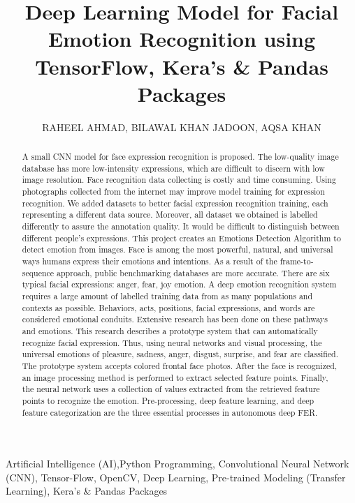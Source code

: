 \documentclass{ieeeaccess}
\begin{document}
\title{Deep Learning Model for Facial Emotion Recognition using TensorFlow, Kera’s & Pandas Packages}
\author
{\uppercase{Raheel Ahmad},\uppercase{ Bilawal Khan Jadoon},\uppercase{ Aqsa Khan}}
\address {MS-AI Students, Sino-Pak Center for Artificial Intelligence (SPCAI), Pak-Austria Fachhochschule: Institute of Applied Sciences and Technology (PAF-IAST).}

\begin{abstract}
A small CNN model for face expression recognition is proposed. The low-quality image database has more low-intensity expressions, which are difficult to discern with low image resolution. Face recognition data collecting is costly and time consuming. Using photographs collected from the internet may improve model training for expression recognition. We added datasets to better facial expression recognition training, each representing a different data source. Moreover, all dataset we obtained is labelled differently to assure the annotation quality. It would be difficult to distinguish between different people's expressions. This project creates an Emotions Detection Algorithm to detect emotion from images. Face is among the most powerful, natural, and universal ways humans express their emotions and intentions. As a result of the frame-to-sequence approach, public benchmarking databases are more accurate. There are six typical facial expressions: anger, fear, joy emotion. A deep emotion recognition system requires a large amount of labelled training data from as many populations and contexts as possible. Behaviors, acts, positions, facial expressions, and words are considered emotional conduits. Extensive research has been done on these pathways and emotions. This research describes a prototype system that can automatically recognize facial expression. Thus, using neural networks and visual processing, the universal emotions of pleasure, sadness, anger, disgust, surprise, and fear are classified. The prototype system accepts colored frontal face photos. After the face is recognized, an image processing method is performed to extract selected feature points. Finally, the neural network uses a collection of values extracted from the retrieved feature points to recognize the emotion. Pre-processing, deep feature learning, and deep feature categorization are the three essential processes in autonomous deep FER.
\end{abstract}

\begin{keywords}
Artificial Intelligence (AI),Python Programming, Convolutional Neural Network (CNN), Tensor-Flow, OpenCV, Deep Learning, Pre-trained Modeling (Transfer Learning), Kera’s & Pandas Packages
\end{keywords}
\end{document}

